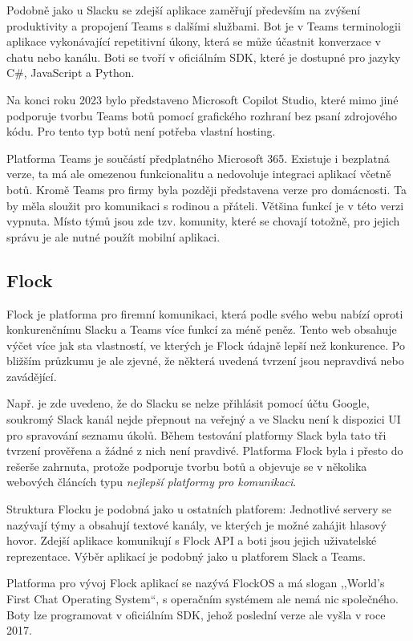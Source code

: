 \documentclass[FM]{tulthesis}
\begin{document}
	Podobně jako u Slacku se zdejší aplikace zaměřují především na zvýšení produktivity a propojení Teams s dalšími službami. Bot je v Teams terminologii aplikace vykonávající repetitivní úkony, která se může účastnit konverzace v chatu nebo kanálu. Boti se tvoří v oficiálním SDK, které je dostupné pro jazyky C\#, JavaScript a Python.
	
	Na konci roku 2023 bylo představeno Microsoft Copilot Studio, které mimo jiné podporuje tvorbu Teams botů pomocí grafického rozhraní bez psaní zdrojového kódu. Pro tento typ botů není potřeba vlastní hosting.
	
	Platforma Teams je součástí předplatného Microsoft 365. Existuje i bezplatná verze, ta má ale omezenou funkcionalitu a nedovoluje integraci aplikací včetně botů. Kromě Teams pro firmy byla později představena verze pro domácnosti. Ta by měla sloužit pro komunikaci s rodinou a přáteli. Většina funkcí je v této verzi vypnuta. Místo týmů jsou zde tzv. komunity, které se chovají totožně, pro jejich správu je ale nutné použít mobilní aplikaci.
	
	\subsection{Flock}
	
	Flock je platforma pro firemní komunikaci, která podle svého webu nabízí oproti konkurenčnímu Slacku a Teams více funkcí za méně peněz. Tento web obsahuje výčet více jak sta vlastností, ve kterých je Flock údajně lepší než konkurence. Po bližším průzkumu je ale zjevné, že některá uvedená tvrzení jsou nepravdivá nebo zavádějící.
	
	Např. je zde uvedeno, že do Slacku se nelze přihlásit pomocí účtu Google, soukromý Slack kanál nejde přepnout na veřejný a ve Slacku není k dispozici UI pro spravování seznamu úkolů. Během testování platformy Slack byla tato tři tvrzení prověřena a žádné z nich není pravdivé. Platforma Flock byla i přesto do rešerše zahrnuta, protože podporuje tvorbu botů a objevuje se v několika webových článcích typu \textit{nejlepší platformy pro komunikaci}.
	
	Struktura Flocku je podobná jako u ostatních platforem: Jednotlivé servery se nazývají týmy a obsahují textové kanály, ve kterých je možné zahájit hlasový hovor. Zdejší aplikace komunikují s Flock API a boti jsou jejich uživatelské reprezentace. Výběr aplikací je podobný jako u platforem Slack a Teams.
	
	Platforma pro vývoj Flock aplikací se nazývá FlockOS a má slogan ,,World's First Chat Operating System``, s operačním systémem ale nemá nic společného. Boty lze programovat v oficiálním SDK, jehož poslední verze ale vyšla v roce 2017.
	
\end{document}
